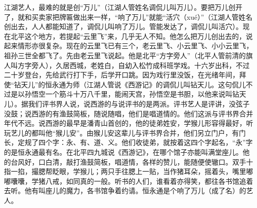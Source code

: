 \documentclass[12pt,UTF8]{ctexbook}
\begin{document}
江湖艺人，最难的就是创“万儿”（江湖人管姓名调侃儿叫万儿）。要把万儿创开了，就和买卖家把牌匾做出来一样，“响了万儿”就能“活穴（xué）”（江湖人管姓名创出去，人人都能知道了，调侃儿叫响了万儿。管能发达了，调侃儿叫活穴）。现在北平这个地方，若提起“云里飞”来，几乎无人不知。他怎么把万儿创出去的，说起来情形亦很复杂。现在的云里飞已有三个，老云里飞、小云里飞、小小云里飞，祖孙三世全都飞了。先由老云里飞说起。他是北平“方字旁人”（北平人管前清的旗人叫方字旁人），久居西城，老姓白，自幼入松竹成科班学戏。十六岁出科，不过二十岁登台，先给武行打下手，后学开口跳。因为戏行里没饭，在光绪年间，拜使“钻天儿”的恒永通为师（江湖人管说《西游记》的调侃儿叫钻天儿。这句侃儿不过是以孙悟空一个筋斗十万八千里，能闹天宫，孙悟空是书胆，以他来说叫钻天儿）。据我们评书界人说，说西游的与说评书的是两派。评书艺人是评讲，没弦子没鼓；说西游的有渔鼓简板，随说随唱，他们是唱道情的。他们这派与评书界合并年代不远。说西游的最早是潘青山首创的，他的徒弟姓安，学猴儿形容得最好，听玩艺儿的都叫他“猴儿安”。由猴儿安这辈儿与评书界合并，他们另立门户，有门长，定规了四个字：永、有、道、义。他们收徒弟，就按着这四个字起名，“永”字的是恒永通最有名。在北平四九城说《西游记》，在哪个馆子亦能叫满堂座儿。他的台风好，口白清，敲打渔鼓简板，唱道情，各样的赞儿，能随便使辙口。双手十指一掐，撮腮帮眨眼，学猴儿；两只手往腮上一贴，当作猪耳朵，摇着头，嘴里嘟嘟囔囔，学猪八戒，如同真的一般。听书的人们，谁看着亦得笑，都往各书馆追着去听。他有叫座儿的魔力，各书馆争着约请。恒永通是个响了万儿（成了名）的艺人。
\end{document}
